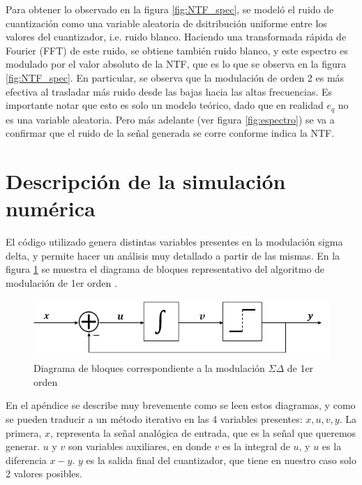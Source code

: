 \documentclass[twoside]{article}
\begin{document}
\begin{multicols}{2}
Para obtener lo observado en la figura \ref{fig:NTF_spec}, se modeló el ruido de cuantización como una variable aleatoria de dsitribución uniforme entre los valores del cuantizador, i.e. ruido blanco. Haciendo una transformada rápida de Fourier (FFT) de este ruido, se obtiene también ruido blanco, y este espectro es modulado por el valor absoluto de la NTF, que es lo que se observa en la figura \ref{fig:NTF_spec}. En particular, se observa que la modulación de orden 2 es más efectiva al trasladar más ruido desde las bajas hacia las altas frecuencias. 
Es importante notar que esto es solo un modelo teórico, dado que en realidad $e_q$ no es una variable aleatoria. Pero más adelante (ver figura \ref{fig:espectro}) se va a confirmar que el ruido de la señal generada se corre conforme indica la NTF.


\section{Descripción de la simulación numérica}


El código utilizado genera distintas variables presentes en la modulación sigma delta, y permite hacer un análisis muy detallado a partir de las mismas. En la figura \ref{fig:bloques} se muestra el diagrama de bloques representativo del algoritmo de modulación de 1er orden \cite{script}.

\begin{figure}[H]
\centering
\includegraphics[width=\linewidth]{figuras/bloques_1erorden.png}
\caption{Diagrama de bloques correspondiente a la modulación $\Sigma\Delta$ de 1er orden}
\label{fig:bloques}
\end{figure}

En el apéndice se describe muy brevemente como se leen estos diagramas, y como se pueden traducir a un método iterativo en las 4 variables presentes: $x,u,v,y$.
La primera, $x$, representa la señal analógica de entrada, que es la señal que queremos generar. $u$ y $v$ son variables auxiliares, en donde $v$ es la integral de $u$, y $u$ es la diferencia $x-y$. $y$ es la salida final del cuantizador, que tiene en nuestro caso solo 2 valores posibles.



\end{multicols}
\end{document}
